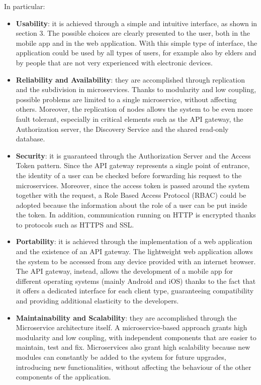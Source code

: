 In particular:
\begin{itemize}
    \item \textbf{Usability}: it is achieved through a simple and intuitive interface, as shown in section 3. The possible choices are clearly presented to the user, both in the mobile app and in the web application. With this simple type of interface, the application could be used by all types of users, for example also by elders and by people that are not very experienced with electronic devices.
    
    \item \textbf{Reliability and Availability}: they are accomplished through replication and the subdivision in microservices. Thanks to modularity and low coupling, possible problems are limited to a single microservice, without affecting others. Moreover, the replication of nodes allows the system to be even more fault tolerant, especially in critical elements such as the API gateway, the Authorization server, the Discovery Service and the shared read-only database. 

    \item \textbf{Security}: it is guaranteed through the Authorization Server and the Access Token pattern. Since the API gateway represents a single point of entrance, the identity of a user can be checked before forwarding his request to the microservices. Moreover, since the access token is passed around the system together with the request, a Role Based Access Protocol (RBAC) could be adopted because the information about the role of a user can be put inside the token. In addition, communication running on HTTP is encrypted thanks to protocols such as HTTPS and SSL.

    \item \textbf{Portability}: it is achieved through the implementation of a web application and the existence of an API gateway. The lightweight web application allows the system to be accessed from any device provided with an internet browser. The API gateway, instead, allows the development of a mobile app for different operating systems (mainly Android and iOS) thanks to the fact that it offers a dedicated interface for each client type, guaranteeing compatibility and providing additional elasticity to the developers.

    \item \textbf{Maintainability and Scalability}: they are accomplished through the Microservice architecture itself. A microservice-based approach grants high modularity and low coupling, with independent components that are easier to maintain, test and fix. Microservices also grant high scalability because new modules can constantly be added to the system for future upgrades, introducing new functionalities, without affecting the behaviour of the other components of the application.
\end{itemize}